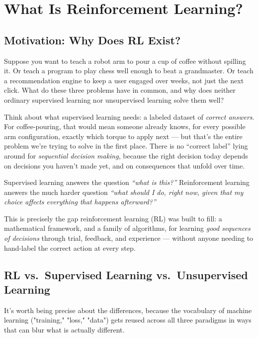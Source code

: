 \chapter{What Is Reinforcement Learning?}
\label{ch:what-is-rl}

\section{Motivation: Why Does RL Exist?}

Suppose you want to teach a robot arm to pour a cup of coffee without
spilling it. Or teach a program to play chess well enough to beat a
grandmaster. Or teach a recommendation engine to keep a user engaged over
weeks, not just the next click. What do these three problems have in
common, and why does neither ordinary supervised learning nor unsupervised
learning solve them well?

Think about what supervised learning needs: a labeled dataset of
\emph{correct answers}. For coffee-pouring, that would mean someone
already knows, for every possible arm configuration, exactly which torque
to apply next — but that's the entire problem we're trying to solve in
the first place. There is no ``correct label'' lying around for
\emph{sequential decision making}, because the right decision today
depends on decisions you haven't made yet, and on consequences that
unfold over time.

\begin{intuitionbox}
Supervised learning answers the question \emph{``what is this?''}
Reinforcement learning answers the much harder question
\emph{``what should I do, right now, given that my choice affects
everything that happens afterward?''}
\end{intuitionbox}

This is precisely the gap reinforcement learning (RL) was built to fill:
a mathematical framework, and a family of algorithms, for learning
\emph{good sequences of decisions} through trial, feedback, and
experience — without anyone needing to hand-label the correct action at
every step.

\section{RL vs.\ Supervised Learning vs.\ Unsupervised Learning}

It's worth being precise about the differences, because the vocabulary of
machine learning ("training," "loss," "data") gets reused across all
three paradigms in ways that can blur what is actually different.

